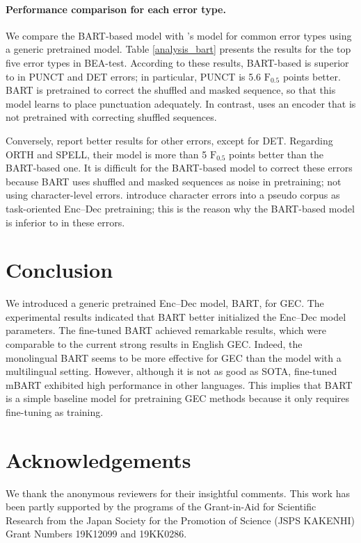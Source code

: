 \documentclass[11pt,a4paper]{article}
\begin{document}
\paragraph{Performance comparison for each error type.}
We compare the BART-based model with \citet{kaneko_bert}'s model for common error types using a generic pretrained model.
Table \ref{analysis_bart} presents the results for the top five error types in BEA-test.
According to these results, BART-based is superior to \citet{kaneko_bert} in PUNCT and DET errors;
 in particular, PUNCT is 5.6 $\mathrm{F_{0.5}}$ points better.
BART is pretrained to correct the shuffled and masked sequence,
 so that this model learns to place punctuation adequately.
In contrast, \citet{kaneko_bert} uses an encoder
 that is not pretrained with correcting shuffled sequences.

Conversely, \citet{kaneko_bert} report better results for other errors, except for DET.
Regarding ORTH and SPELL, their model is more than 5 $\mathrm{F_{0.5}}$ points better than the BART-based one.
It is difficult for the BART-based model to correct these errors because BART uses shuffled and masked sequences as noise in pretraining; not using character-level errors.
\citet{kaneko_bert} introduce character errors into a pseudo corpus as task-oriented Enc--Dec pretraining;
 this is the reason why the BART-based model is inferior to \citet{kaneko_bert} in these errors.

\section{Conclusion}
We introduced a generic pretrained Enc--Dec model, BART, for GEC.
The experimental results indicated that BART better initialized the Enc--Dec model parameters.
The fine-tuned BART achieved remarkable results, which were comparable to the current strong results in English GEC.
Indeed, the monolingual BART seems to be more effective for GEC than the model with a multilingual setting.
However, although it is not as good as SOTA, fine-tuned mBART exhibited high performance in other languages.
This implies that
 BART is a simple baseline model for pretraining GEC methods because it only requires fine-tuning as training.

\section*{Acknowledgements}
We thank the anonymous reviewers for their insightful comments.
This work has been partly supported by the programs of the
Grant-in-Aid for Scientific Research from the Japan Society for the
Promotion of Science (JSPS KAKENHI) Grant Numbers 19K12099 and
19KK0286.



\end{document}
